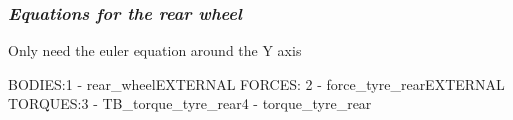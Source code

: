 \documentclass{article}
\begin{document}
\subsubsection{\textbf{\textit{Equations for the rear wheel}}}
\begin{maplegroup}
\begin{Maple Normal}{
Only need the euler equation around the Y axis}\end{Maple Normal}

\end{maplegroup}
\begin{maplegroup}
\begin{mapleinput}
\end{mapleinput}
\mapleresult
BODIES:1 - rear\_wheelEXTERNAL FORCES:
2 - force\_tyre\_rearEXTERNAL TORQUES:3 - TB\_torque\_tyre\_rear4 - torque\_tyre\_rear\mapleresult
\begin{maplelatex}
\end{maplelatex}
\end{maplegroup}
\end{document}
